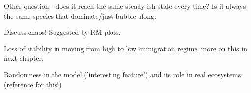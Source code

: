 Other question - does it reach the same steady-ish state every time? Is it always the same species that dominate/just bubble along.

Discuss chaos! Suggested by RM plots.


Loss of stability in moving from high to low immigration regime..more on this in next chapter.

Randomness in the model ('interesting feature') and its role in real ecosystems (reference for this!)